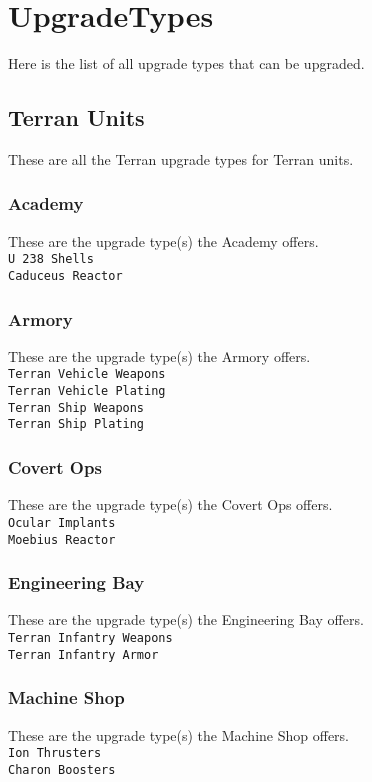 \chapter{UpgradeTypes}
\label{upgradetype}
Here is the list of all upgrade types that can be upgraded. 

\section{Terran Units}
These are all the Terran upgrade types for Terran units. \\

\subsection{Academy}
These are the upgrade type(s) the Academy offers. \\
\verb|U 238 Shells| \\
\verb|Caduceus Reactor|

\subsection{Armory}
These are the upgrade type(s) the Armory offers. \\
\verb|Terran Vehicle Weapons|\\
\verb|Terran Vehicle Plating|\\
\verb|Terran Ship Weapons|\\
\verb|Terran Ship Plating|\\

\subsection{Covert Ops}
These are the upgrade type(s) the Covert Ops offers. \\
\verb|Ocular Implants|\\
\verb|Moebius Reactor|

\subsection{Engineering Bay}
These are the upgrade type(s) the Engineering Bay offers. \\
\verb|Terran Infantry Weapons|\\
\verb|Terran Infantry Armor|\\

\subsection{Machine Shop}
These are the upgrade type(s) the Machine Shop offers. \\
\verb|Ion Thrusters|\\
\verb|Charon Boosters|

